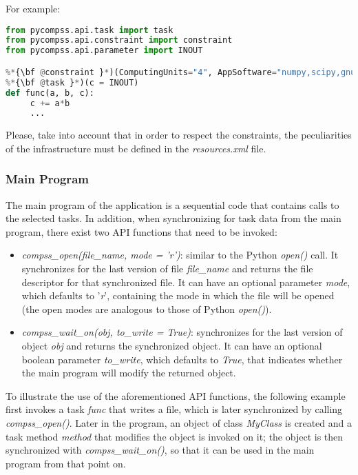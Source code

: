For example:

\begin{lstlisting}[language=python]
from pycompss.api.task import task
from pycompss.api.constraint import constraint
from pycompss.api.parameter import INOUT

%*{\bf @constraint }*)(ComputingUnits="4", AppSoftware="numpy,scipy,gnuplot", memorySize="$MIN_MEM_REQ")
%*{\bf @task }*)(c = INOUT)
def func(a, b, c):
     c += a*b
     ...
\end{lstlisting}

Please, take into account that in order to respect the constraints, the peculiarities of the infrastructure must be defined in the {\it resources.xml} file.


\subsubsection{Main Program}
The main program of the application is a sequential code that contains calls to the selected tasks. 
In addition, when synchronizing for task data from the main program, 
there exist two API functions that need to be invoked:

\begin{itemize}
 \item {\it compss\_open(file\_name, mode = 'r')}: similar to the Python {\it open()} call. It synchronizes
       for the last version of file {\it file\_name} and returns the file descriptor for that synchronized
       file. It can have an optional parameter {\it mode}, which defaults to '{\it r}', containing the
       mode in which the file will be opened (the open modes are analogous to those of
       Python {\it open()}).
 \item {\it compss\_wait\_on(obj, to\_write = True)}: synchronizes for the last version of object {\it obj}
       and returns the synchronized object. It can have an optional boolean parameter
       {\it to\_write}, which defaults to {\it True}, that indicates whether the main program will modify the
       returned object.
\end{itemize}

To illustrate the use of the aforementioned API functions, the following example first invokes a task 
{\it func} that writes a file, which is later synchronized by calling {\it compss\_open()}. 
Later in the program, an object of class {\it MyClass} is created and a task method {\it method} 
that modifies the object is invoked on it; the object is then synchronized with {\it compss\_wait\_on()}, 
so that it can be used in the main program from that point on.

